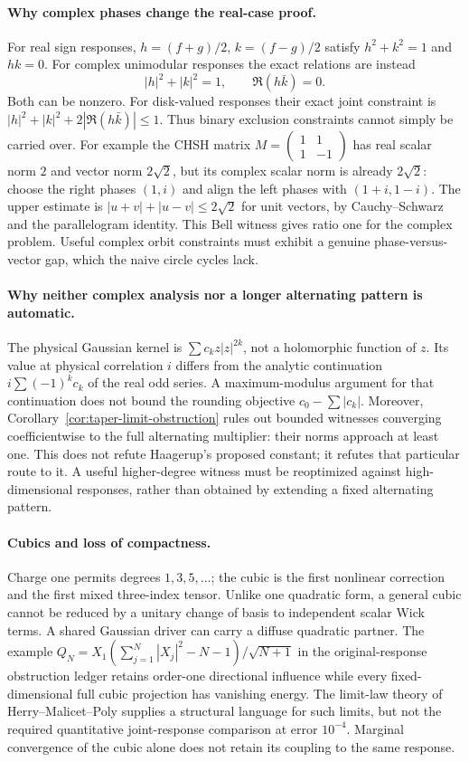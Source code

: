 \paragraph{Why complex phases change the real-case proof.}
For real sign responses, $h=(f+g)/2$, $k=(f-g)/2$ satisfy
$h^2+k^2=1$ and $hk=0$. For complex unimodular responses the exact
relations are instead
\[
 |h|^2+|k|^2=1,\qquad \Re(h\bar k)=0.
\]
Both can be nonzero. For disk-valued responses their exact joint
constraint is $|h|^2+|k|^2+2|\Re(h\bar k)|\le1$.
Thus binary exclusion constraints cannot simply be carried over.
For example the CHSH matrix
$M=\left(\begin{smallmatrix}1&1\\1&-1\end{smallmatrix}\right)$
has real scalar norm $2$ and vector norm $2\sqrt2$, but its complex
scalar norm is already $2\sqrt2$: choose the right phases $(1,i)$
and align the left phases with $(1+i,1-i)$. The upper estimate is
$|u+v|+|u-v|\le2\sqrt2$ for unit vectors, by Cauchy--Schwarz and
the parallelogram identity. This Bell witness gives ratio one for
the complex problem. Useful complex orbit constraints must exhibit
a genuine phase-versus-vector gap, which the naive circle cycles lack.

\paragraph{Why neither complex analysis nor a longer alternating pattern is automatic.}
The physical Gaussian kernel is $\sum c_k z|z|^{2k}$, not a holomorphic
function of $z$. Its value at physical correlation $i$ differs from
the analytic continuation $i\sum(-1)^kc_k$ of the real odd series.
A maximum-modulus argument for that continuation does not bound the
rounding objective $c_0-\sum|c_k|$. Moreover,
Corollary~\ref{cor:taper-limit-obstruction} rules out bounded witnesses
converging coefficientwise to the full alternating multiplier: their
norms approach at least one. This does not refute Haagerup's proposed
constant; it refutes that particular route to it. A useful higher-degree
witness must be reoptimized against high-dimensional responses, rather
than obtained by extending a fixed alternating pattern.

\paragraph{Cubics and loss of compactness.}
Charge one permits degrees $1,3,5,\ldots$; the cubic is the first
nonlinear correction and the first mixed three-index tensor. Unlike
one quadratic form, a general cubic cannot be reduced by a unitary
change of basis to independent scalar Wick terms. A shared Gaussian
driver can carry a diffuse quadratic partner. The example
$Q_N=X_1(\sum_{j=1}^N|X_j|^2-N-1)/\sqrt{N+1}$ in the original-response
obstruction ledger retains order-one directional influence while every
fixed-dimensional full cubic projection has vanishing energy.
The limit-law theory of Herry--Malicet--Poly \cite{HMP24} supplies
a structural language for such limits, but not the required quantitative
joint-response comparison at error $10^{-4}$. Marginal convergence of
the cubic alone does not retain its coupling to the same response.


